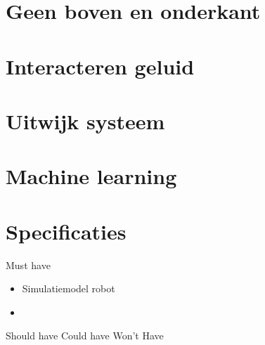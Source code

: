 \documentclass[10pt,a4paper]{article}
\begin{document}
\section{Geen boven en onderkant}

\section{Interacteren geluid}

\section{Uitwijk systeem}

\section{Machine learning}

\section{Specificaties}
Must have
\begin{itemize}
\item Simulatiemodel robot
\item 
\end{itemize}
Should have
Could have
Won't Have
\end{document}
